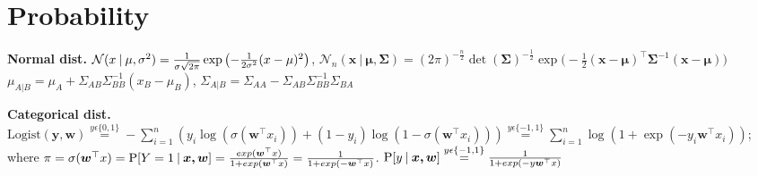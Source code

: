 \section{Probability}
\textbf{Normal dist.}
$\mathcal{N}(x\:|\: \mu, \sigma^{2}) = \frac{1}{\sigma \sqrt{2\pi}}\exp\left(-\frac{1}{2\sigma^{2}}(x - \mu)^{2}\right)$,
$\mathcal{N}_{n}(\bm{x}\:|\: \bm{\mu}, \bm{\Sigma}) =
(2\pi)^{-\frac{n}{2}}\det(\bm{\Sigma})^{-\frac{1}{2}}\exp \big(-\frac{1}{2}(\bm{x} -
\bm{\mu})^{\top}\bm{\Sigma}^{-1}(\bm{x} - \bm{\mu}) \big)$\\
$\mu_{A|B}=\mu_A+\Sigma_{AB}\Sigma^{-1}_{BB}(x_B-\mu_B)$,
$\Sigma_{A|B}=\Sigma_{AA}-\Sigma_{AB}\Sigma^{-1}_{BB}\Sigma_{BA}$

\textbf{Categorical dist.}
$\text{Logist} (\bm{y},\bm{w}) \overset{y\epsilon\{0,1\}}{=} -\sum_{i=1}^{n}(y_{i}\log(
\sigma(\bm{w}^{\top}x_{i}))+(1-y_{i})\log(1-\sigma(\bm{w}^{\top}x_{i})))
\overset{y\epsilon\{-1,1\}}{=}\sum_{i=1}^{n}\log(1+\exp(-y_{i}\bm{w}^{\top}x_{i}))$;
where
$\pi = \sigma(\bm{w}^{\top}x) = \prob{Y=1}[\bm{x,w}] = \frac{exp(\bm{w}^{\top}x)}{1 + exp(\bm{w}^{\top}x)} =
\frac{1}{1 + exp(-\bm{w}^{\top}x)}$. $\prob{y}[\bm{x,w}] \overset{y\epsilon\{-1,1\}}{=}
\frac{1}{1 + exp(-y\bm{w}^{\top}x)}$ \\

%

